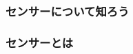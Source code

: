 \begin{frame}[fragile]
    \frametitle{センサーについて知ろう}
    \begin{description}
    \end{description}
\end{frame}

\begin{frame}[fragile]
    \frametitle{センサーとは}
    \begin{description}
    \end{description}
\end{frame}
